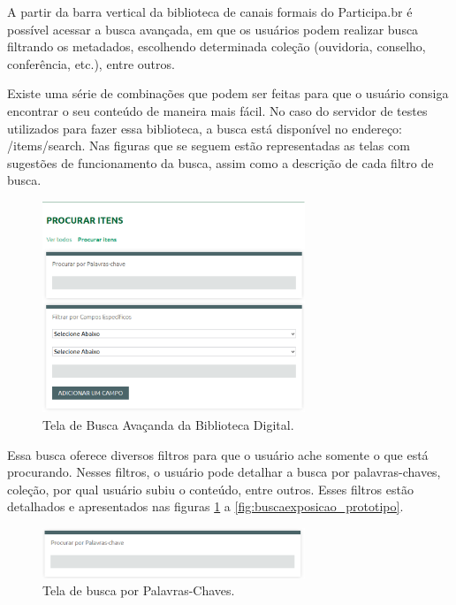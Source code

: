 A partir da barra vertical da biblioteca de canais formais do Participa.br é possível acessar a busca avançada, em que os usuários podem realizar busca filtrando os metadados, escolhendo determinada coleção (ouvidoria, conselho, conferência, etc.), entre outros.

Existe uma série de combinações que podem ser feitas para que o usuário consiga encontrar o seu conteúdo de maneira mais fácil. No caso do servidor de testes utilizados para fazer essa biblioteca, a busca está disponível no endereço: /items/search. Nas figuras que se seguem estão representadas as telas com sugestões de funcionamento da busca, assim como a descrição de cada filtro de busca.

\graphicspath{{figuras/prototipo/}}
\begin{figure}[H]
\centering
\includegraphics[width=0.7\textwidth]{tela-busca}
\caption{Tela de Busca Avaçanda da Biblioteca Digital.}
\label{fig:buscaavancada_prototipo}
\end{figure}

Essa busca oferece diversos filtros para que o usuário ache somente o que está procurando. Nesses filtros, o usuário pode detalhar a busca por palavras-chaves, coleção, por qual usuário subiu o conteúdo, entre outros. Esses filtros estão detalhados e apresentados nas figuras \ref{fig:buscaavancada_prototipo} a \ref{fig:buscaexposicao_prototipo}.

\graphicspath{{figuras/prototipo/}}
\begin{figure}[H]
\centering
\includegraphics[width=0.7\textwidth]{busca-palavra-chave}
\caption{Tela de busca por Palavras-Chaves.}
\label{fig:buscachaves_prototipo}
\end{figure}

